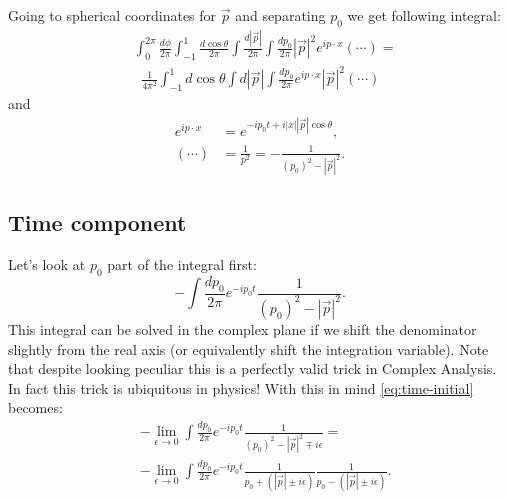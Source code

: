 \documentclass[aps,prd,final,twocolumn,floats,floatfix,nofootinbib,10pt]{revtex4-1}
\begin{document}
Going to spherical coordinates for $\vec{p}$ and separating $p_0$ we get following integral:
\begin{align}\label{eq:expanded-integral}
& \int_0^{2 \pi} \frac{d \phi}{2 \pi} \int_{-1}^{1} \frac{d \cos{\theta}}{2 \pi} \int \frac{d |\vec{p}|}{2 \pi}
  \int \frac{d p_0}{2 \pi} |\vec{p}|^2 e^{i p \cdot x} \left( \cdots \right) = \\
& \; \; \frac{1}{4 \pi^2} \int_{-1}^{1} d \cos{\theta} \int d |\vec{p}|
  \int \frac{d p_0}{2 \pi} e^{i p \cdot x} |\vec{p}|^2 \left( \cdots \right)
\end{align}
and
\begin{align}
e^{i p \cdot x} & = e^{-i p_0 t + i |x| |\vec{p}| \cos{\theta}}, \\
\left( \cdots \right) & = \frac{1}{p^2} = -\frac{1}{(p_0)^2 - |\vec{p}|^2}.
\end{align}

\subsection{Time component}

Let's look at $p_0$ part of the integral first:
\begin{equation}\label{eq:time-initial}
-\int \frac{d p_0}{2 \pi} e^{-i p_0 t} \frac{1}{(p_0)^2 - |\vec{p}|^2}.
\end{equation}
This integral can be solved in the complex plane if we shift the denominator slightly from the real axis (or equivalently shift the integration variable). Note that despite looking peculiar this is a perfectly valid trick in Complex Analysis. In fact this trick is ubiquitous in physics! With this in mind \eqref{eq:time-initial} becomes:
\begin{align}
& -\lim_{\epsilon \to 0} \int \frac{d p_0}{2 \pi} e^{-i p_0 t} \frac{1}{(p_0)^2 - |\vec{p}|^2 \mp i \epsilon} = \\
& -\lim_{\epsilon \to 0} \int \frac{d p_0}{2 \pi} e^{-i p_0 t} \frac{1}{p_0 + \left( |\vec{p}| \pm i \epsilon \right)}
  \frac{1}{p_0 - \left(|\vec{p}| \pm i \epsilon \right)}.
\end{align}
\end{document}
